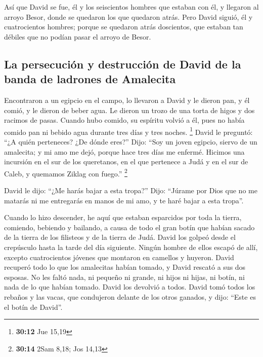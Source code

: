  Así que David se fue, él y los seiscientos hombres que
estaban con él, y llegaron al arroyo Besor, donde se quedaron los que
quedaron atrás.  Pero David siguió, él y cuatrocientos
hombres; porque se quedaron atrás doscientos, que estaban tan débiles
que no podían pasar el arroyo de Besor.

\hypertarget{la-persecuciuxf3n-y-destrucciuxf3n-de-david-de-la-banda-de-ladrones-de-amalecita}{%
\subsection{La persecución y destrucción de David de la banda de
ladrones de
Amalecita}\label{la-persecuciuxf3n-y-destrucciuxf3n-de-david-de-la-banda-de-ladrones-de-amalecita}}

 Encontraron a un egipcio en el campo, lo llevaron a
David y le dieron pan, y él comió, y le dieron de beber agua.
 Le dieron un trozo de una torta de higos y dos racimos
de pasas. Cuando hubo comido, su espíritu volvió a él, pues no había
comido pan ni bebido agua durante tres días y tres noches. \footnote{\textbf{30:12}
  Jue 15,19}  David le preguntó: ``¿A quién perteneces?
¿De dónde eres?'' Dijo: ``Soy un joven egipcio, siervo de un amalecita;
y mi amo me dejó, porque hace tres días me enfermé. 
Hicimos una incursión en el sur de los queretanos, en el que pertenece a
Judá y en el sur de Caleb, y quemamos Ziklag con fuego.'' \footnote{\textbf{30:14}
  2Sam 8,18; Jos 14,13}

 David le dijo: ``¿Me harás bajar a esta tropa?'' Dijo:
``Júrame por Dios que no me matarás ni me entregarás en manos de mi amo,
y te haré bajar a esta tropa''.

 Cuando lo hizo descender, he aquí que estaban esparcidos
por toda la tierra, comiendo, bebiendo y bailando, a causa de todo el
gran botín que habían sacado de la tierra de los filisteos y de la
tierra de Judá.  David los golpeó desde el crepúsculo
hasta la tarde del día siguiente. Ningún hombre de ellos escapó de allí,
excepto cuatrocientos jóvenes que montaron en camellos y huyeron.
 David recuperó todo lo que los amalecitas habían tomado,
y David rescató a sus dos esposas.  No les faltó nada, ni
pequeño ni grande, ni hijos ni hijas, ni botín, ni nada de lo que habían
tomado. David los devolvió a todos.  David tomó todos los
rebaños y las vacas, que condujeron delante de los otros ganados, y
dijo: ``Este es el botín de David''.

